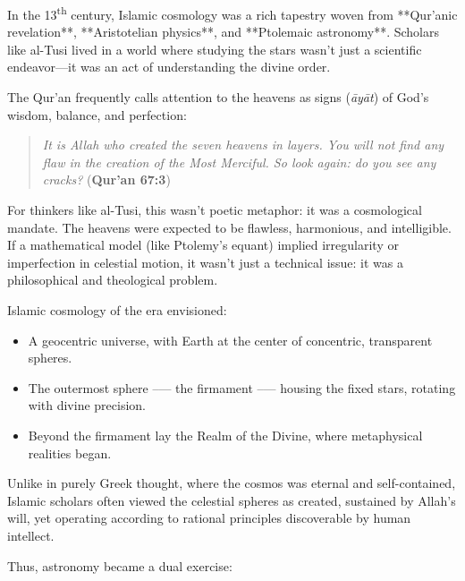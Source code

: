 \begin{tcolorbox}[colback=blue!5!white, colframe=blue!50!black, title={Historical Sidebar: Islamic Cosmology — Reading the Heavens Through Revelation and Reason}, breakable]

  In the 13\textsuperscript{th} century, Islamic cosmology was a rich tapestry woven from **Qur'anic revelation**, **Aristotelian physics**, and **Ptolemaic astronomy**. Scholars like al-Tusi lived in a world where studying the stars wasn’t just a scientific endeavor—it was an act of understanding the divine order.
  
  The Qur'an frequently calls attention to the heavens as signs (\textit{āyāt}) of God’s wisdom, balance, and perfection:
  
  \begin{quote}
  \textit{It is Allah who created the seven heavens in layers. You will not find any flaw in the creation of the Most Merciful. So look again: do you see any cracks?}  
  \hfill (\textbf{Qur'an 67:3})
  \end{quote}
  
  For thinkers like al-Tusi, this wasn’t poetic metaphor: it was a cosmological mandate. The heavens were expected to be flawless, harmonious, and intelligible. If a mathematical model (like Ptolemy’s equant) implied irregularity or imperfection in celestial motion, it wasn’t just a technical issue: it was a philosophical and theological problem.
  
  \medskip
  
  Islamic cosmology of the era envisioned:
  
  \begin{itemize}
    \item A geocentric universe, with Earth at the center of concentric, transparent spheres.
    \item The outermost sphere --— the firmament --— housing the fixed stars, rotating with divine precision.
    \item Beyond the firmament lay the Realm of the Divine, where metaphysical realities began.
  \end{itemize}
  
  Unlike in purely Greek thought, where the cosmos was eternal and self-contained, Islamic scholars often viewed the celestial spheres as created, sustained by Allah’s will, yet operating according to rational principles discoverable by human intellect.
  
  \medskip
  
  Thus, astronomy became a dual exercise:
  

\end{tcolorbox}
